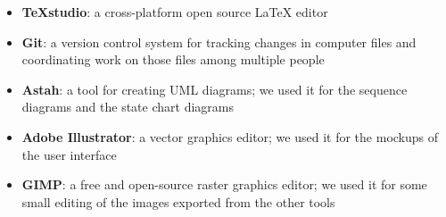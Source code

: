 \begin{itemize}
\item \textbf{TeXstudio}: a cross-platform open source LaTeX editor
\item \textbf{Git}: a version control system for tracking changes in computer files and coordinating work on those files among multiple people
\item \textbf{Astah}: a tool for creating UML diagrams; we used it for the sequence diagrams and the state chart diagrams
\item \textbf{Adobe Illustrator}: a vector graphics editor; we used it for the mockups of the user interface
\item \textbf{GIMP}: a free and open-source raster graphics editor; we used it for some small editing of the images exported from the other tools
\end{itemize}
